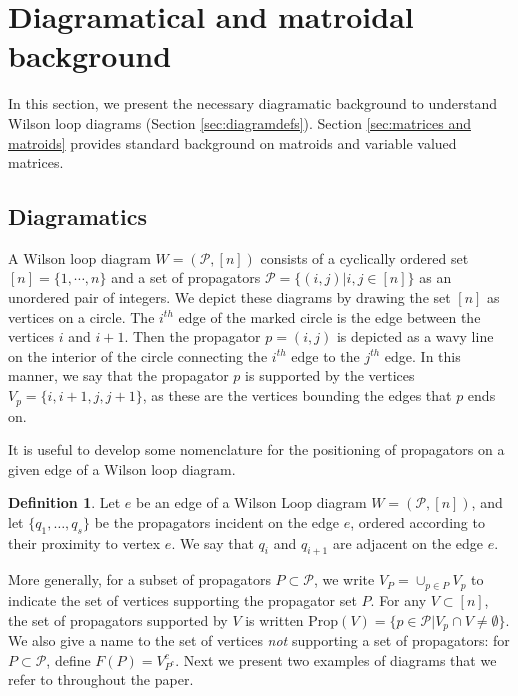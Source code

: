 \documentclass[11pt]{article}
\newcommand{\cP}{\mathcal{P}}
\newcommand{\Prop}{\textrm{Prop}}
\theoremstyle{remark}
\theoremstyle{definition}
\newtheorem{dfn}[thm]{Definition}
\begin{document}
\section{Diagramatical and matroidal background \label{sec:background}}

In this section, we present the necessary diagramatic background to understand Wilson loop diagrams (Section \ref{sec:diagramdefs}). Section \ref{sec:matrices and matroids} provides standard background on matroids and variable valued matrices.

\subsection{Diagramatics \label{sec:diagramdefs}}
A Wilson loop diagram $W = (\cP, [n])$ consists of a cyclically ordered set $[n] = \{1, \cdots, n\}$ and a set of propagators $\cP = \{(i,j) | i, j \in [n]\}$ as an unordered pair of integers. We depict these diagrams by drawing the set $[n]$ as vertices on a circle. The $i^{th}$ edge of the marked circle is the edge between the vertices $i$ and $i+1$. Then the propagator $p =(i,j)$ is depicted as a wavy line on the interior of the circle connecting the $i^{th}$ edge to the $j^{th}$ edge. In this manner, we say that the propagator $p$ is supported by the vertices $V_p = \{i, i+1, j, j+1\}$, as these are the vertices bounding the edges that $p$ ends on. 

It is useful to develop some nomenclature for the positioning of propagators on a given edge of a Wilson loop diagram.
  
\begin{dfn}\label{dfn:adjacentprops} Let $e$ be an edge of a Wilson Loop diagram $W = (\cP, [n])$, and  let $\{q_1, \ldots, q_s \}$ be the propagators incident on the edge $e$, ordered according to their proximity to vertex $e$. We say that $q_i$ and $q_{i+1}$ are adjacent on the edge $e$. \end{dfn}

More generally, for a subset of propagators $P \subset \cP$, we write $V_P = \cup_{p \in P} V_p$ to indicate the set of vertices supporting the propagator set $P$. For any $V \subset [n]$, the set of propagators supported by $V$ is written $\Prop(V) = \{ p \in \cP | V_p \cap V \neq \emptyset\}$.  We also give a name to the set of vertices \emph{not} supporting a set of propagators: for $P \subset \cP$, define $F(P) = V_{P^c}^c$. Next we present two examples of diagrams that we refer to throughout the paper.
\end{document}
